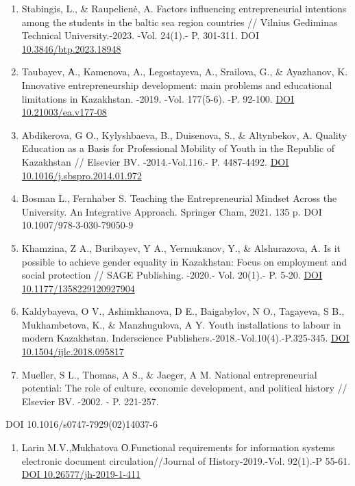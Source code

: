 \begin{enumerate}
\def\labelenumi{\arabic{enumi}.}
\setcounter{enumi}{3}
\item
  Stabingis, L., \& Raupelienė, A. Factors influencing entrepreneurial
  intentions among the students in the baltic sea region countries //
  Vilnius Gediminas Technical University.-2023. -Vol. 24(1).- P.
  301-311. DOI
  \href{https://doi.org/10.3846/btp.2023.18948}{10.3846/btp.2023.18948}
\item
  Taubayev, А., Kamenova, A., Legostayeva, A., Srailova, G., \&
  Ayazhanov, K. Innovative entrepreneurship development: main problems
  and educational limitations in Kazakhstan. -2019. -Vol. 177(5-6). -P.
  92-100. \href{https://doi.org/10.21003/ea.v177-08}{DOI
  10.21003/ea.v177-08}
\item
  Abdikerova, G O., Kylyshbaeva, B., Duisenova, S., \& Altynbekov, A.
  Quality Education as a Basis for Professional Mobility of Youth in the
  Republic of Kazakhstan // Elsevier BV. -2014.-Vol.116.- P. 4487-4492.
  \href{https://doi.org/10.1016/j.sbspro.2014.01.972}{DOI
  10.1016/j.sbspro.2014.01.972}
\item
  Bosman L., Fernhaber S. Teaching the Entrepreneurial Mindset Across
  the University. An Integrative Approach. Springer Cham, 2021. 135 p.
  DOI 10.1007/978-3-030-79050-9
\item
  Khamzina, Z A., Buribayev, Y A., Yermukanov, Y., \& Alshurazova, A. Is
  it possible to achieve gender equality in Kazakhstan: Focus on
  employment and social protection // SAGE Publishing. -2020.- Vol.
  20(1).- P. 5-20. \href{https://doi.org/10.1177/1358229120927904}{DOI
  10.1177/1358229120927904}
\item
  Kaldybayeva, O V., Ashimkhanova, D E., Baigabylov, N O., Tagayeva, S
  B., Mukhambetova, K., \& Manzhugulova, A Y. Youth installations to
  labour in modern Kazakhstan. Inderscience
  Publishers.-2018.-Vol.10(4).-P.325-345.
  \href{https://doi.org/10.1504/ijlc.2018.095817}{DOI
  10.1504/ijlc.2018.095817}
\item
  Mueller, S L., Thomas, A S., \& Jaeger, A M. National entrepreneurial
  potential: The role of culture, economic development, and political
  history // Elsevier BV. -2002. - P. 221-257.
\end{enumerate}

DOI 10.1016/s0747-7929(02)14037-6

\begin{enumerate}
\def\labelenumi{\arabic{enumi}.}
\setcounter{enumi}{10}
\item
  Larin M.V.,Мukhatova О.Functional requirements for information systems
  electronic document circulation//Journal of History-2019.-Vol.
  92(1).-P 55-61. \href{https://doi.org/10.26577/jh-2019-1-411}{DOI
  10.26577/jh-2019-1-411}
\end{enumerate}


